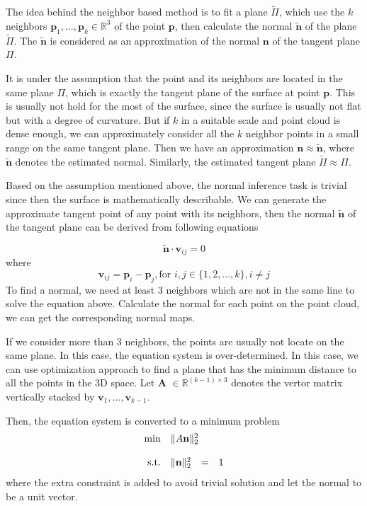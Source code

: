 The idea behind the neighbor based method is to fit a plane $ \tilde\Pi $, which use the $ k $ neighbors $ \textbf{p}_1, ..., \textbf{p}_k \in \mathbb{R}^3 $ of the point $ \textbf{p} $, then calculate the normal $ \tilde{\textbf{n}} $ of the plane $ \tilde\Pi $. The $ \tilde{\textbf{n}} $ is considered as an approximation of the normal $ \textbf{n} $ of the tangent plane $ \Pi $.

It is under the assumption that the point and its neighbors are located in the same plane $ \Pi $, which is exactly the tangent plane of the surface at point $\textbf{p}  $. 
This is usually not hold for the most of the surface, since the surface is usually not flat but with a degree of curvature. But if $ k $ in a suitable scale and point cloud is dense enough, we can approximately consider all the $ k $ neighbor points in a small range on the same tangent plane. Then we have an approximation $ \textbf{n} \approx \tilde{\textbf{n}}$, where $ \tilde{\textbf{n}} $ denotes the estimated normal. Similarly, the estimated tangent plane $ \tilde{\Pi} \approx \Pi $. 

Based on the assumption mentioned above, the normal inference task is trivial since then the surface is mathematically describable. We can generate the approximate tangent point of any point with its neighbors, then the normal $ \tilde{\textbf{n}} $ of the tangent plane can be derived from following equations

\[\tilde{\textbf{n}} \cdot \textbf{v}_{ij}  = 0 \]
where 
\[ \textbf{v}_{ij} = \textbf{p}_i - \textbf{p}_j, \text{for } i, j \in \{ 1,2,...,k\}, i\neq j \]
To find a normal, we need at least 3 neighbors which are not in the same line to solve the equation above. Calculate the normal for each point on the point cloud, we can get the corresponding normal maps. 

If we consider more than 3 neighbors, the points are usually not locate on the same plane. In this case, the equation system is over-determined. In this case, we can use optimization approach to find a plane that has the minimum distance to all the points in the 3D space. Let  $ \textbf{A }\in \mathbb{R}^{(k-1)\times 3} $  denotes the vertor  matrix vertically stacked by $ \textbf{v}_1, ..., \textbf{v}_{k-1} $. 

Then, the equation system is converted to a minimum problem 
\begin{equation}
	\begin{array}{rrclcl}
		\displaystyle \min & \multicolumn{3}{l}{\| A  \bn \|^2_2} \\
		\\
		\textrm{s.t.} & \| \bn \|^2_2 & = & 1 
	\end{array}
\end{equation}
where the extra constraint is added to avoid trivial solution and let the normal to be a unit vector.

